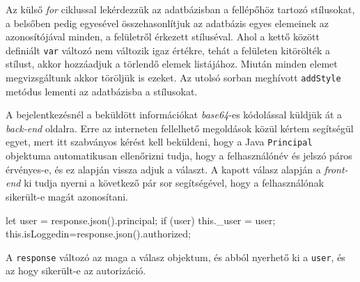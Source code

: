 Az külső \textit{for} ciklussal lekérdezzük az adatbázisban a fellépőhöz tartozó stílusokat, a belsőben pedig egyesével összehasonlítjuk az adatbázis egyes elemeinek az azonosítójával minden, a felületről érkezett stíluséval. Ahol a kettő között definiált \texttt{var} változó nem változik igaz értékre, tehát a felületen kitörölték a stílust, akkor hozzáadjuk a törlendő elemek listájához. Miután minden elemet megvizsgáltunk akkor töröljük is ezeket. Az utolsó sorban meghívott \texttt{addStyle} metódus lementi az adatbázisba a stílusokat.


A bejelentkezésnél a beküldött információkat \textit{base64}-es kódolással küldjük át a \textit{back-end} oldalra. Erre az interneten fellelhető megoldások közül kértem segítségül egyet, mert itt szabványos kérést kell beküldeni, hogy a Java \texttt{Principal} objektuma automatikusan ellenőrizni tudja, hogy a felhasználónév és jelszó páros érvényes-e, és ez alapján vissza adjuk a választ. A kapott válasz alapján a \textit{front-end} ki tudja nyerni a következő pár sor segítségével, hogy a felhasználónak sikerült-e magát azonosítani.
\begin{java}
let user = response.json().principal;
if (user) {
	this._user = user;
	this.isLoggedin=response.json().authorized;
}
\end{java}
A \texttt{response} változó az maga a válasz objektum, és abból nyerhető ki a \texttt{user}, és az hogy sikerült-e az autorizáció.


